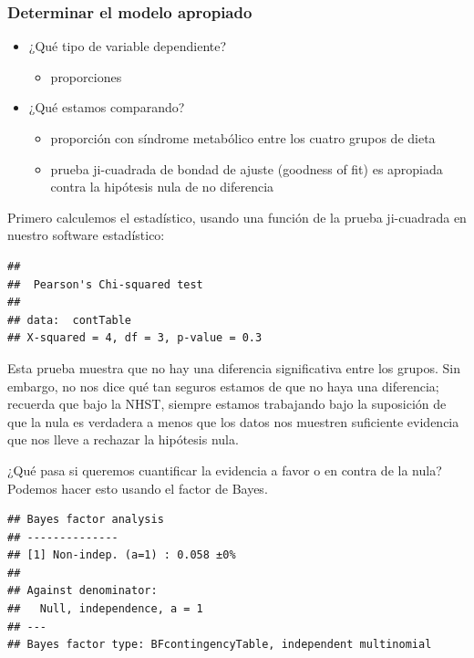 \documentclass[
  12pt,
]{book}
\providecommand{\tightlist}{%
  \setlength{\itemsep}{0pt}\setlength{\parskip}{0pt}}
\theoremstyle{definition}
\theoremstyle{definition}
\theoremstyle{definition}
\theoremstyle{remark}
\begin{document}
\hypertarget{determinar-el-modelo-apropiado}{%
\subsubsection{Determinar el modelo apropiado}\label{determinar-el-modelo-apropiado}}

\begin{itemize}
\tightlist
\item
  ¿Qué tipo de variable dependiente?

  \begin{itemize}
  \tightlist
  \item
    proporciones
  \end{itemize}
\item
  ¿Qué estamos comparando?

  \begin{itemize}
  \tightlist
  \item
    proporción con síndrome metabólico entre los cuatro grupos de dieta
  \item
    prueba ji-cuadrada de bondad de ajuste (goodness of fit) es apropiada contra la hipótesis nula de no diferencia
  \end{itemize}
\end{itemize}

Primero calculemos el estadístico, usando una función de la prueba ji-cuadrada en nuestro software estadístico:

\begin{verbatim}
## 
## 	Pearson's Chi-squared test
## 
## data:  contTable
## X-squared = 4, df = 3, p-value = 0.3
\end{verbatim}

Esta prueba muestra que no hay una diferencia significativa entre los grupos. Sin embargo, no nos dice qué tan seguros estamos de que no haya una diferencia; recuerda que bajo la NHST, siempre estamos trabajando bajo la suposición de que la nula es verdadera a menos que los datos nos muestren suficiente evidencia que nos lleve a rechazar la hipótesis nula.

¿Qué pasa si queremos cuantificar la evidencia a favor o en contra de la nula? Podemos hacer esto usando el factor de Bayes.

\begin{verbatim}
## Bayes factor analysis
## --------------
## [1] Non-indep. (a=1) : 0.058 ±0%
## 
## Against denominator:
##   Null, independence, a = 1 
## ---
## Bayes factor type: BFcontingencyTable, independent multinomial
\end{verbatim}
\end{document}
